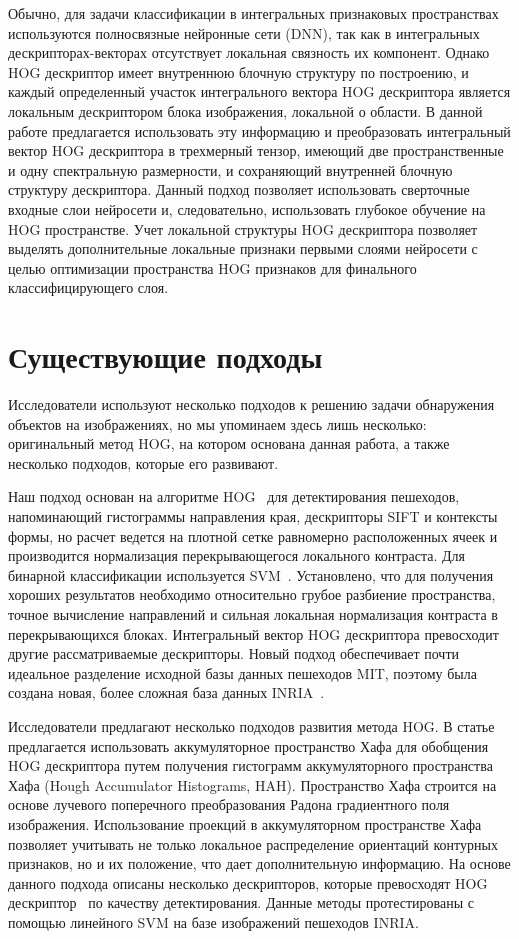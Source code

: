 \documentclass[12pt,twoside]{article}
\begin{document}
Обычно, для задачи классификации в интегральных признаковых пространствах используются полносвязные нейронные сети (DNN), так как в интегральных дескрипторах-векторах отсутствует локальная связность их компонент. Однако HOG дескриптор имеет внутреннюю блочную структуру по построению, и каждый определенный участок интегрального вектора HOG дескриптора является локальным дескриптором блока изображения, локальной о области. В данной работе предлагается использовать эту информацию и преобразовать интегральный вектор HOG дескриптора в трехмерный тензор, имеющий две пространственные и одну спектральную размерности, и сохраняющий внутренней блочную структуру дескриптора. Данный подход позволяет использовать сверточные входные слои нейросети и, следовательно, использовать глубокое обучение на HOG пространстве. Учет локальной структуры HOG дескриптора позволяет выделять дополнительные локальные признаки первыми слоями нейросети с целью оптимизации пространства HOG признаков для финального классифицирующего слоя.

\section{Существующие подходы}
Исследователи используют несколько подходов к решению задачи обнаружения объектов на изображениях, но мы упоминаем здесь лишь несколько: оригинальный метод HOG, на котором основана данная работа, а также несколько подходов, которые его развивают. 

Наш подход основан на алгоритме HOG~\cite{dalaltriggs2005} для детектирования пешеходов, напоминающий гистограммы направления края, дескрипторы SIFT и контексты формы, но расчет ведется на плотной сетке равномерно расположенных ячеек и производится нормализация перекрывающегося локального контраста. Для бинарной классификации используется SVM~\cite{Vorontsov}. Установлено, что для получения хороших результатов необходимо относительно грубое разбиение пространства, точное вычисление направлений и сильная локальная нормализация контраста в перекрывающихся блоках. Интегральный вектор HOG дескриптора превосходит другие рассматриваемые дескрипторы. Новый подход обеспечивает почти идеальное разделение исходной базы данных пешеходов MIT, поэтому была создана новая, более сложная база данных INRIA~\cite{inria}.

Исследователи предлагают несколько подходов развития метода HOG. В статье~\cite{Samsonov17} предлагается использовать аккумуляторное пространство Хафа для обобщения HOG дескриптора путем получения гистограмм аккумуляторного пространства Хафа (Hough Accumulator Histograms, HAH). Пространство Хафа строится на основе лучевого поперечного преобразования Радона градиентного поля изображения. Использование проекций в аккумуляторном пространстве Хафа позволяет учитывать не только локальное распределение ориентаций контурных признаков, но и их положение, что дает дополнительную информацию. На основе данного подхода описаны несколько дескрипторов, которые превосходят HOG дескриптор~\cite{dalaltriggs2005} по качеству детектирования. Данные методы протестированы с помощью линейного SVM  на базе изображений пешеходов INRIA. 
\end{document}
